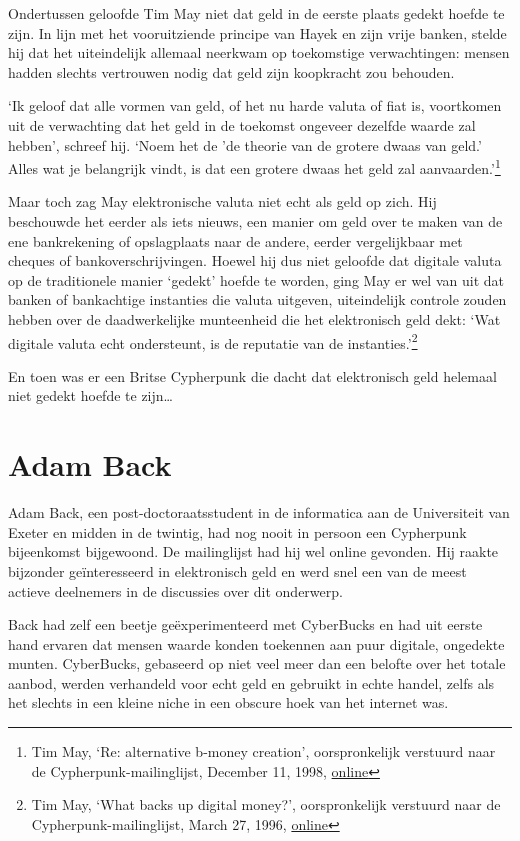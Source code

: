 \documentclass[
  a5paper,
  smalldemyvopaper,11pt,twoside,onecolumn,openright,extrafontsizes]{memoir}
\begin{document}
Ondertussen geloofde Tim May niet dat geld in de eerste plaats gedekt
hoefde te zijn. In lijn met het vooruitziende principe van Hayek en zijn
vrije banken, stelde hij dat het uiteindelijk allemaal neerkwam op
toekomstige verwachtingen: mensen hadden slechts vertrouwen nodig dat
geld zijn koopkracht zou behouden.

`Ik geloof dat alle vormen van geld, of het nu harde valuta of fiat is,
voortkomen uit de verwachting dat het geld in de toekomst ongeveer
dezelfde waarde zal hebben', schreef hij. `Noem het de 'de theorie van
de grotere dwaas van geld.' Alles wat je belangrijk vindt, is dat een
grotere dwaas het geld zal aanvaarden.'\footnote{Tim May, `Re:
  alternative b-money creation', oorspronkelijk verstuurd naar de
  Cypherpunk-mailinglijst, December 11, 1998,
  \href{https://cypherpunks.venona.com/date/1998/12/msg00455.html}{online}}

Maar toch zag May elektronische valuta niet echt als geld op zich. Hij
beschouwde het eerder als iets nieuws, een manier om geld over te maken
van de ene bankrekening of opslagplaats naar de andere, eerder
vergelijkbaar met cheques of bankoverschrijvingen. Hoewel hij dus niet
geloofde dat digitale valuta op de traditionele manier `gedekt' hoefde
te worden, ging May er wel van uit dat banken of bankachtige instanties
die valuta uitgeven, uiteindelijk controle zouden hebben over de
daadwerkelijke munteenheid die het elektronisch geld dekt: `Wat digitale
valuta echt ondersteunt, is de reputatie van de instanties.'\footnote{Tim
  May, `What backs up digital money?', oorspronkelijk verstuurd naar de
  Cypherpunk-mailinglijst, March 27, 1996,
  \href{https://cypherpunks.venona.com/date/1996/03/msg01576.html}{online}}

En toen was er een Britse Cypherpunk die dacht dat elektronisch geld
helemaal niet gedekt hoefde te zijn\ldots{}

\section{Adam Back}\label{adam-back}

Adam Back, een post-doctoraatsstudent in de informatica aan de
Universiteit van Exeter en midden in de twintig, had nog nooit in
persoon een Cypherpunk bijeenkomst bijgewoond. De mailinglijst had hij
wel online gevonden. Hij raakte bijzonder geïnteresseerd in elektronisch
geld en werd snel een van de meest actieve deelnemers in de discussies
over dit onderwerp.

Back had zelf een beetje geëxperimenteerd met CyberBucks en had uit
eerste hand ervaren dat mensen waarde konden toekennen aan puur
digitale, ongedekte munten. CyberBucks, gebaseerd op niet veel meer dan
een belofte over het totale aanbod, werden verhandeld voor echt geld en
gebruikt in echte handel, zelfs als het slechts in een kleine niche in
een obscure hoek van het internet was.
\end{document}
